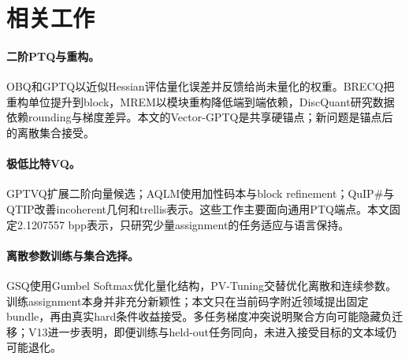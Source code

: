 \section{相关工作}

\paragraph{二阶PTQ与重构。} OBQ和GPTQ以近似Hessian评估量化误差并反馈给尚未量化的权重\cite{obc,gptq}。BRECQ把重构单位提升到block\cite{brecq}，MREM以模块重构降低端到端依赖\cite{mrem}，DiscQuant研究数据依赖rounding与梯度差异\cite{discquant}。本文的Vector-GPTQ是共享硬锚点；新问题是锚点后的离散集合接受。

\paragraph{极低比特VQ。} GPTVQ扩展二阶向量候选\cite{gptvq}；AQLM使用加性码本与block refinement\cite{aqlm}；QuIP\#与QTIP改善incoherent几何和trellis表示\cite{quip,qtip}。这些工作主要面向通用PTQ端点。本文固定2.1207557 bpp表示，只研究少量assignment的任务适应与语言保持。

\paragraph{离散参数训练与集合选择。} GSQ使用Gumbel Softmax优化量化结构\cite{gsq}，PV-Tuning交替优化离散和连续参数\cite{pvtuning}。训练assignment本身并非充分新颖性；本文只在当前码字附近领域提出固定bundle，再由真实hard条件收益接受。多任务梯度冲突说明聚合方向可能隐藏负迁移\cite{pcgrad}；V13进一步表明，即便训练与held-out任务同向，未进入接受目标的文本域仍可能退化。
